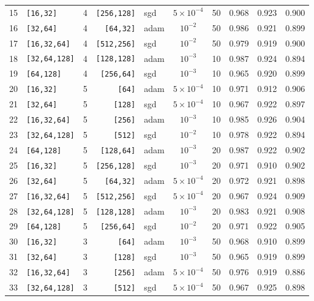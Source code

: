 \begin{table}[htbp]
{\begin{tabular}{rlcrlccrrr}
15 & \texttt{[16,32]} & 4 & \texttt{[256,128]} & sgd & $5\!\times\!10^{-4}$ & 50 & 0.968 & 0.923 & 0.900 \\
16 & \texttt{[32,64]} & 4 & \texttt{[64,32]} & adam & $10^{-2}$ & 50 & 0.986 & 0.921 & 0.899 \\
17 & \texttt{[16,32,64]} & 4 & \texttt{[512,256]} & sgd & $10^{-2}$ & 50 & 0.979 & 0.919 & 0.900 \\
18 & \texttt{[32,64,128]} & 4 & \texttt{[128,128]} & adam & $10^{-3}$ & 10 & 0.987 & 0.924 & 0.894 \\
19 & \texttt{[64,128]} & 4 & \texttt{[256,64]} & sgd & $10^{-3}$ & 10 & 0.965 & 0.920 & 0.899 \\
20 & \texttt{[16,32]} & 5 & \texttt{[64]} & adam & $5\!\times\!10^{-4}$ & 10 & 0.971 & 0.912 & 0.906 \\
21 & \texttt{[32,64]} & 5 & \texttt{[128]} & sgd & $5\!\times\!10^{-4}$ & 10 & 0.967 & 0.922 & 0.897 \\
22 & \texttt{[16,32,64]} & 5 & \texttt{[256]} & adam & $10^{-3}$ & 10 & 0.985 & 0.926 & 0.904 \\
23 & \texttt{[32,64,128]} & 5 & \texttt{[512]} & sgd & $10^{-2}$ & 10 & 0.978 & 0.922 & 0.894 \\
24 & \texttt{[64,128]} & 5 & \texttt{[128,64]} & adam & $10^{-3}$ & 20 & 0.987 & 0.922 & 0.902 \\
25 & \texttt{[16,32]} & 5 & \texttt{[256,128]} & sgd & $10^{-3}$ & 20 & 0.971 & 0.910 & 0.902 \\
26 & \texttt{[32,64]} & 5 & \texttt{[64,32]} & adam & $5\!\times\!10^{-4}$ & 20 & 0.972 & 0.921 & 0.898 \\
27 & \texttt{[16,32,64]} & 5 & \texttt{[512,256]} & sgd & $5\!\times\!10^{-4}$ & 20 & 0.967 & 0.924 & 0.909 \\
28 & \texttt{[32,64,128]} & 5 & \texttt{[128,128]} & adam & $10^{-3}$ & 20 & 0.983 & 0.921 & 0.908 \\
29 & \texttt{[64,128]} & 5 & \texttt{[256,64]} & sgd & $10^{-2}$ & 20 & 0.971 & 0.922 & 0.905 \\
30 & \texttt{[16,32]} & 3 & \texttt{[64]} & adam & $10^{-3}$ & 50 & 0.968 & 0.910 & 0.899 \\
31 & \texttt{[32,64]} & 3 & \texttt{[128]} & sgd & $10^{-3}$ & 50 & 0.965 & 0.919 & 0.899 \\
32 & \texttt{[16,32,64]} & 3 & \texttt{[256]} & adam & $5\!\times\!10^{-4}$ & 50 & 0.976 & 0.919 & 0.886 \\
33 & \texttt{[32,64,128]} & 3 & \texttt{[512]} & sgd & $5\!\times\!10^{-4}$ & 50 & 0.967 & 0.925 & 0.898 \\

\end{tabular}}
\end{table}

